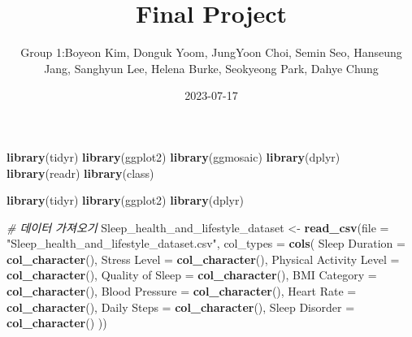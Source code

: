 \documentclass[
  11pt,
]{article}
\title{Final Project}
\author{Group 1:Boyeon Kim, Donguk Yoom, JungYoon Choi, Semin Seo,
Hanseung Jang, Sanghyun Lee, Helena Burke, Seokyeong Park, Dahye Chung}
\date{2023-07-17}
\newenvironment{Shaded}{\begin{snugshade}}{\end{snugshade}}
\newcommand{\AttributeTok}[1]{\textcolor[rgb]{0.13,0.29,0.53}{#1}}
\newcommand{\CommentTok}[1]{\textcolor[rgb]{0.56,0.35,0.01}{\textit{#1}}}
\newcommand{\FunctionTok}[1]{\textcolor[rgb]{0.13,0.29,0.53}{\textbf{#1}}}
\newcommand{\NormalTok}[1]{#1}
\newcommand{\OtherTok}[1]{\textcolor[rgb]{0.56,0.35,0.01}{#1}}
\newcommand{\StringTok}[1]{\textcolor[rgb]{0.31,0.60,0.02}{#1}}
\begin{document}
\maketitle

\begin{Shaded}
\begin{Highlighting}[]
\FunctionTok{library}\NormalTok{(tidyr)}
\FunctionTok{library}\NormalTok{(ggplot2)}
\FunctionTok{library}\NormalTok{(ggmosaic)}
\FunctionTok{library}\NormalTok{(dplyr)}
\FunctionTok{library}\NormalTok{(readr)}
\FunctionTok{library}\NormalTok{(class)}
\end{Highlighting}
\end{Shaded}

\begin{Shaded}
\begin{Highlighting}[]
\FunctionTok{library}\NormalTok{(tidyr)}
\FunctionTok{library}\NormalTok{(ggplot2)}
\FunctionTok{library}\NormalTok{(dplyr)}

\CommentTok{\# 데이터 가져오기}
\NormalTok{Sleep\_health\_and\_lifestyle\_dataset }\OtherTok{\textless{}{-}} \FunctionTok{read\_csv}\NormalTok{(}\AttributeTok{file =} \StringTok{"Sleep\_health\_and\_lifestyle\_dataset.csv"}\NormalTok{,}
  \AttributeTok{col\_types =} \FunctionTok{cols}\NormalTok{(}
    \StringTok{\textquotesingle{}Sleep Duration\textquotesingle{}} \OtherTok{=} \FunctionTok{col\_character}\NormalTok{(),}
    \StringTok{\textquotesingle{}Stress Level\textquotesingle{}} \OtherTok{=} \FunctionTok{col\_character}\NormalTok{(),}
    \StringTok{\textquotesingle{}Physical Activity Level\textquotesingle{}} \OtherTok{=} \FunctionTok{col\_character}\NormalTok{(),}
    \StringTok{\textquotesingle{}Quality of Sleep\textquotesingle{}} \OtherTok{=} \FunctionTok{col\_character}\NormalTok{(),}
    \StringTok{\textquotesingle{}BMI Category\textquotesingle{}} \OtherTok{=} \FunctionTok{col\_character}\NormalTok{(),}
    \StringTok{\textquotesingle{}Blood Pressure\textquotesingle{}} \OtherTok{=} \FunctionTok{col\_character}\NormalTok{(),}
    \StringTok{\textquotesingle{}Heart Rate\textquotesingle{}} \OtherTok{=} \FunctionTok{col\_character}\NormalTok{(),}
    \StringTok{\textquotesingle{}Daily Steps\textquotesingle{}} \OtherTok{=} \FunctionTok{col\_character}\NormalTok{(),}
    \StringTok{\textquotesingle{}Sleep Disorder\textquotesingle{}} \OtherTok{=} \FunctionTok{col\_character}\NormalTok{()}
\NormalTok{  ))}


\end{Highlighting}
\end{Shaded}
\end{document}
